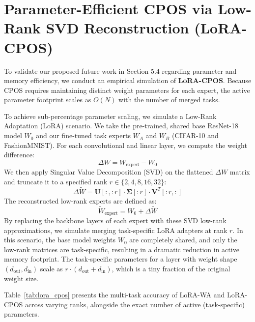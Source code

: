 \documentclass{article}
\theoremstyle{plain}
\theoremstyle{definition}
\theoremstyle{remark}
\begin{document}
\section{Parameter-Efficient CPOS via Low-Rank SVD Reconstruction (LoRA-CPOS)}
\label{subsec:lora_cpos}
To validate our proposed future work in Section 5.4 regarding parameter and memory efficiency, we conduct an empirical simulation of \textbf{LoRA-CPOS}. Because CPOS requires maintaining distinct weight parameters for each expert, the active parameter footprint scales as $O(N)$ with the number of merged tasks. 

To achieve sub-percentage parameter scaling, we simulate a Low-Rank Adaptation (LoRA) scenario. We take the pre-trained, shared base ResNet-18 model $W_0$ and our fine-tuned task experts $W_A$ and $W_B$ (CIFAR-10 and FashionMNIST). For each convolutional and linear layer, we compute the weight difference:
\begin{equation}
\Delta W = W_{\text{expert}} - W_0
\end{equation}
We then apply Singular Value Decomposition (SVD) on the flattened $\Delta W$ matrix and truncate it to a specified rank $r \in \{2, 4, 8, 16, 32\}$:
\begin{equation}
\Delta \tilde{W} = \mathbf{U}[:, :r] \cdot \mathbf{\Sigma}[:r] \cdot \mathbf{V}^T[:r, :]
\end{equation}
The reconstructed low-rank experts are defined as:
\begin{equation}
\tilde{W}_{\text{expert}} = W_0 + \Delta \tilde{W}
\end{equation}
By replacing the backbone layers of each expert with these SVD low-rank approximations, we simulate merging task-specific LoRA adapters at rank $r$. In this scenario, the base model weights $W_0$ are completely shared, and only the low-rank matrices are task-specific, resulting in a dramatic reduction in active memory footprint. The task-specific parameters for a layer with weight shape $(d_{\text{out}}, d_{\text{in}})$ scale as $r \cdot (d_{\text{out}} + d_{\text{in}})$, which is a tiny fraction of the original weight size.

Table~\ref{tab:lora_cpos} presents the multi-task accuracy of LoRA-WA and LoRA-CPOS across varying ranks, alongside the exact number of active (task-specific) parameters.
\end{document}
